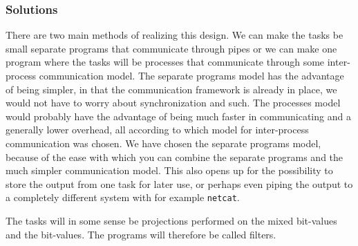 \subsubsection{Solutions}

There are two main methods of realizing this design. We can make the
tasks be small separate programs that communicate through pipes or we
can make one program where the tasks will be processes that
communicate through some inter-process communication model. The
separate programs model has the advantage of being simpler, in that
the communication framework is already in place, we would not have to
worry about synchronization and such. The processes model would
probably have the advantage of being much faster in communicating and
a generally lower overhead, all according to which model for
inter-process communication was chosen. We have chosen the separate
programs model, because of the ease with which you can combine the
separate programs and the much simpler communication model. This also
opens up for the possibility to store the output from one task for
later use, or perhaps even piping the output to a completely different
system with for example \texttt{netcat}. 

The tasks will in some sense be projections performed on the mixed
bit-values and the bit-values. The programs will therefore be called
filters. 



